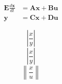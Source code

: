 \documentclass{report}
\begin{document}
	\begin{equation}
		\begin{split}
			\boldsymbol{E}\frac{d\boldsymbol{x}}{dt} & = \boldsymbol{A}\boldsymbol{x} + \boldsymbol{B} \boldsymbol{u}\\
			\boldsymbol{y} & = \boldsymbol{C}\boldsymbol{x} + \boldsymbol{D}\boldsymbol{u}
		\end{split}
	\end{equation}

\begin{equation}
	\left| \frac{x}{y} \right|
\end{equation}
\begin{equation}
	\left| \frac{x}{y} \right|
\end{equation}
	\begin{equation}
		\left\| \frac{x}{u} \right\|
	\end{equation}
	
\end{document}
